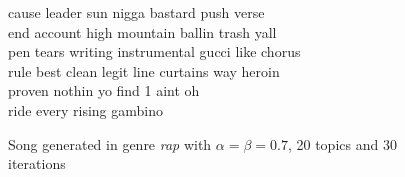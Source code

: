 \begin{figure}
\begin{mdframed}
cause leader sun nigga bastard push verse \\
end account high mountain ballin trash yall \\
pen tears writing instrumental gucci like chorus \\
rule best clean legit line curtains way heroin \\
proven nothin yo find 1 aint oh \\
ride every rising gambino
\caption{Song generated in genre \textit{rap} with $\alpha=\beta=0.7$, 20 topics and 30 iterations}
\label{text:rap_song}
 \end{mdframed}

\end{figure}